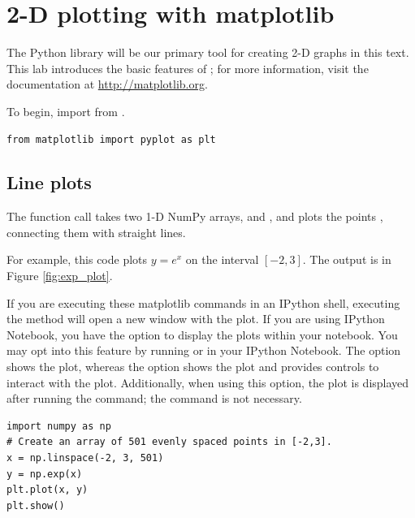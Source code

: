 \label{lab:Matplotlib_and_Mayavi}

\section*{2-D plotting with matplotlib}
The Python library  will be our primary tool for creating 2-D graphs in this text. This lab introduces the basic features of ; for more information, visit the documentation at \url{http://matplotlib.org}.

To begin, import  from .
\begin{lstlisting}
from matplotlib import pyplot as plt
\end{lstlisting}

\subsection*{Line plots}
The function call  takes two 1-D NumPy arrays,  and , and plots the points , connecting them with straight lines.

For example, this code plots $y=e^x$ on the interval $[-2,3]$. The output is in Figure \ref{fig:exp_plot}.

\begin{info}
If you are executing these matplotlib commands in an IPython shell, executing the  method will open a new window with the plot. If you are using IPython Notebook, you have the option to display the plots within your notebook. You may opt into this feature by running  or  in your IPython Notebook. The  option shows the plot, whereas the  option shows the plot and provides controls to interact with the plot. Additionally, when using this option, the plot is displayed after running the  command; the  command is not necessary. 
\end{info}

\begin{lstlisting}
import numpy as np
# Create an array of 501 evenly spaced points in [-2,3].
x = np.linspace(-2, 3, 501)
y = np.exp(x)
plt.plot(x, y)
plt.show()
\end{lstlisting}

